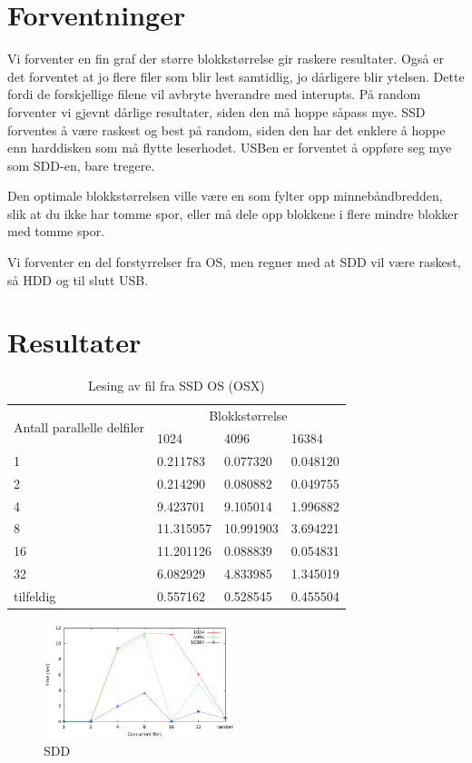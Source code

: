 \documentclass[titlepage]{article}
\begin{document}
\section{Forventninger}
Vi forventer en fin graf der større blokkstørrelse gir raskere resultater.
Også er det forventet at jo flere filer som blir lest samtidlig, jo dårligere blir ytelsen. Dette fordi de forskjellige filene vil avbryte hverandre med interupts.
På random forventer vi gjevnt dårlige resultater, siden den må hoppe såpass mye.
SSD forventes å være raskest og best på random, siden den har det enklere å hoppe enn harddisken som må flytte leserhodet. USBen er forventet å oppføre seg mye som SDD-en, bare tregere.

Den optimale blokkstørrelsen ville være en som fylter opp minnebåndbredden, slik at du ikke har tomme spor, eller må dele opp blokkene i flere mindre blokker med tomme spor.

Vi forventer en del forstyrrelser fra OS, men regner med at SDD vil være raskest, så HDD og til slutt USB.


\section{Resultater}

\begin{table}[h!]
\caption{Lesing av fil fra SSD OS (OSX)}
\label{SSD}
\centering
\begin{tabular}{|l|l|l|l|}
\hline
\multirow{2}{*}{ Antall parallelle delfiler} & \multicolumn{3}{|c|}{Blokkstørrelse} \\
 & 1024 & 4096 & 16384\\
\hline
1         &  0.211783  &  0.077320  & 0.048120 \\
2         &  0.214290  &  0.080882  & 0.049755 \\
4         &  9.423701  &  9.105014  & 1.996882 \\
8         & 11.315957  & 10.991903  & 3.694221 \\
16        & 11.201126  &  0.088839  & 0.054831 \\
32        &  6.082929  &  4.833985  & 1.345019 \\
tilfeldig &  0.557162  &  0.528545  & 0.455504 \\
\hline
\end{tabular}
\end{table}

\begin{figure}[h!]
  \caption{SDD}
  \label{fig:sdd}
  \centering
  \includegraphics[width=0.5\textwidth]{res/result-sdd}
\end{figure}
\end{document}
